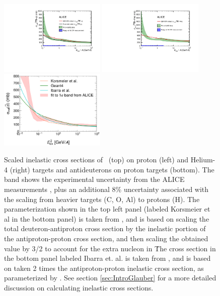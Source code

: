 \begin{figure}[hbtp]
    \centering
    \includegraphics[width=0.45\textwidth]{figures/Antihelum_on_p_targets_scaled_with_paramterisation.pdf}
    \includegraphics[width=0.45\textwidth]{figures/Antihelum_on_p_targets_scaled.pdf}
    \includegraphics[width=0.45\textwidth]{figures/dbar_xs_comparison_dbarNotInLabels.png}
    \caption{Scaled inelastic cross sections of \ahe\ (top) on proton (left) and Helium-4 (right) targets and antideuterons on proton targets (bottom). The band shows the experimental uncertainty from the ALICE measurements \cite{}, plus an additional 8\% uncertainty associated with the scaling from heavier targets (C, O, Al) to protons (H). The parameterization shown in the top left panel (labeled Korsmeier et al in the bottom panel) is taken from \cite{Korsmeier2018}, and is based on scaling the total deuteron-antiproton cross section by the inelastic portion of the antiproton-proton cross section, and then scaling the obtained value by 3/2 to account for the extra nucleon in \ahe\. The cross section in the bottom panel labeled Ibarra et. al. is taken from \cite{Ibarra:2012cc}, and is based on taken 2 times the antiproton-proton inelastic cross section, as parameterized by \cite{Ibarra2012cc_ref40}. See section \ref{sec:IntroGlauber} for a more detailed discussion on calculating inelastic cross sections.}
    \label{fig:ScaledXS_ahe_adeut}
\end{figure}

